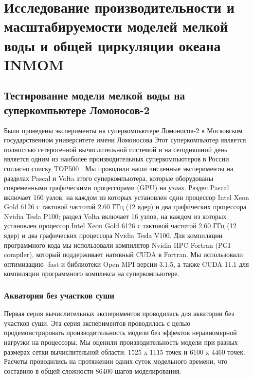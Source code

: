 \chapter{Исследование производительности и масштабируемости моделей мелкой воды и общей циркуляции океана INMOM}\label{ch:ch3}

\section{Тестирование модели мелкой воды на суперкомпьютере Ломоносов-2}\label{sec:ch3/sec1}

Были проведены эксперименты на суперкомпьютере Ломоносов-2 в Московском государственном университете имени Ломоносова %
Этот суперкомпьютер является полностью гетерогенной вычислительной системой и на сегодняшний день является одним из наиболее производительных суперкомпьютеров в России согласно списку TOP500 \cite{TOP500}.
Мы проводили наши численные эксперименты на разделах Pascal и Volta этого суперкомпьютера, которые оборудованы современными графическими процессорами (GPU) на узлах. Раздел Pascal включает 160 узлов, на каждом из которых установлен один процессор Intel Xeon Gold 6126 с тактовой частотой 2.60 ГГц (12 ядер) и два графических процессора Nvidia Tesla P100; раздел Volta включает 16 узлов, на каждом из которых  установлен процессор Intel Xeon Gold 6126 с тактовой частотой 2.60 ГГц (12 ядер) и два графических процессора Nvidia Tesla V100. 
Для компиляции программного кода мы использовали компилятор Nvidia HPC Fortran (PGI compiler), который поддерживает нативный CUDA в Fortran.
Мы использовали оптимизацию -fast и библиотеки Open MPI версии 3.1.5, а также CUDA 11.1 для компиляции программного комплекса на суперкомпьютере.

\subsection{Акватория без участков суши}\label{sec:ch3/sec1/sub1}

Первая серия вычислительных экспериментов проводилась для акватории без участков суши. Эта серия экспериментов проводилась с целью продемонстрировать производительность модели без эффектов неравномерной нагрузки на процессоры.
Мы оценили производительность модели при разных размерах сетки вычислительной области: 1525 x 1115 точек и 6100 x 4460 точек.
Расчеты проводились на протяжении одних суток модельного времени, что составило в общей сложности 86400 шагов моделирования.

